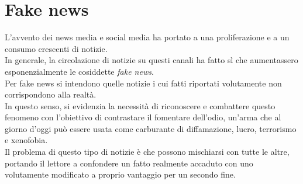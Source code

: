 \documentclass[12pt]{report}
\theoremstyle{definition}
\begin{document}
\section{Fake news} \label{fakenews}
L'avvento dei news media e social media ha portato a una proliferazione e a un consumo crescenti di notizie.
\\
In generale, la circolazione di notizie su questi canali ha fatto sì che aumentassero esponenzialmente le cosiddette \textit{fake news}.
\\
Per fake news si intendono quelle notizie i cui fatti riportati volutamente non corrispondono alla realtà.
\\
In questo senso, si evidenzia la necessità di riconoscere e combattere questo fenomeno con l'obiettivo di contrastare il fomentare dell'odio, un'arma che al giorno d'oggi può essere usata come carburante di diffamazione, lucro, terrorismo e xenofobia.
\\
Il problema di questo tipo di notizie è che possono mischiarsi con tutte le altre, portando il lettore a confondere un fatto realmente accaduto con uno volutamente modificato a proprio vantaggio per un secondo fine.
\end{document}
